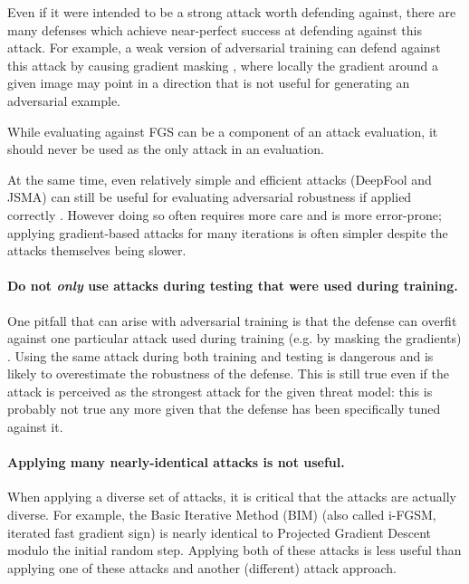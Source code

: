 \documentclass{article} %
\begin{document}
Even if it were intended to be a strong attack worth defending
against, there are many defenses which achieve near-perfect success at
defending against this attack.
%
For example, a weak version of
adversarial training can defend against this attack by causing
gradient masking  \citep{tramer2017ensemble},
where locally the gradient around a given image may
point in a direction that is not useful for generating an adversarial
example.

While evaluating against FGS can be a component of an attack
evaluation, it should never be used as the only attack in an
evaluation.

At the same time, even relatively simple and efficient attacks
(DeepFool and JSMA) \citep{moosavi2016deepfool,papernot2016limitations}
can still be useful for evaluating adversarial
robustness if applied correctly \citep{jetley2018friends,carlini2016defensive}.
%
However doing so often requires more care and is more error-prone;
applying gradient-based attacks for many iterations is often simpler
despite the attacks themselves being slower.


\paragraph{Do not \emph{only} use attacks during testing that were used during training.}
One pitfall that can arise with adversarial training is that the defense
can overfit against one particular attack
used during training (e.g. by masking the gradients)  \citep{tramer2017ensemble}.
%
Using the same attack during both training and testing is dangerous
and is likely to overestimate the robustness of the defense.
%
This is still true even if the attack is perceived as the
strongest attack for the given
threat model: this is probably not true any more given that the defense
has been specifically tuned against it.

\paragraph{Applying many nearly-identical attacks is not useful.}
When applying a diverse set of attacks, it is critical that the attacks
are actually diverse.
%
For example, the Basic Iterative Method (BIM) (also
called i-FGSM, iterated fast gradient sign) \citep{kurakin2016adversarial}
is nearly identical to Projected Gradient Descent \citep{madry2017towards}
modulo the initial random step.
%
Applying both of these attacks is less useful than applying one of these
attacks and another (different) attack approach.
\end{document}

